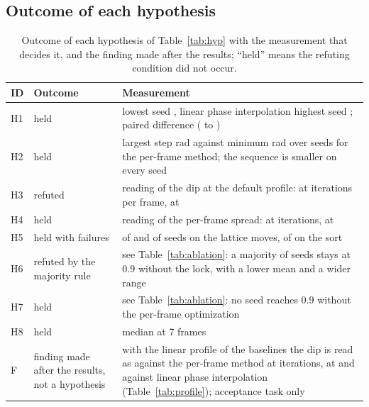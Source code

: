 \subsection{Outcome of each hypothesis}

\begin{table}[t]
\centering\small
\caption{Outcome of each hypothesis of Table~\ref{tab:hyp} with the measurement that decides it, and the finding made after the results; ``held'' means the refuting condition did not occur.}
\label{tab:outcome}
\begin{tabular}{@{}l p{3.6cm} p{8.6cm}@{}}
\toprule
ID & Outcome & Measurement\\
\midrule
H1 & held & lowest seed \bTwoMin{}, linear phase interpolation highest seed \lpiMax{}; paired difference \diffTwoMean{} (\diffTwoCiLo{} to \diffTwoCiHi{})\\
H2 & held & largest step \accBStepMax{} rad against minimum \accKimFiveStepMin{} rad over seeds for the per-frame method; the sequence is smaller on every seed\\
H3 & refuted & reading of the dip at the default profile: \readThirteenKimFiveDip{} at \parKimIters{} iterations per frame, \readThirteenKimTenDip{} at \parFrameIters{}\\
H4 & held & reading of the per-frame spread: \readThirteenKimFiveSigma{} at \parKimIters{} iterations, \readThirteenKimTenSigma{} at \parFrameIters{}\\
H5 & held with failures & \longAMet{} of \longSeeds{} and \longBMet{} of \longSeeds{} seeds on the lattice moves, \cTenMet{} of \cTenSeeds{} on the sort\\
H6 & refuted by the majority rule & see Table~\ref{tab:ablation}: a majority of seeds stays at $0.9$ without the lock, with a lower mean and a wider range\\
H7 & held & see Table~\ref{tab:ablation}: no seed reaches $0.9$ without the per-frame optimization\\
H8 & held & median \bTwoMedSeven{} at 7 frames\\
F & finding made after the results, not a hypothesis & with the linear profile of the baselines the dip is read as \readProfileLinearKimFiveDip{} against the per-frame method at \parKimIters{} iterations, \readProfileLinearKimTenDip{} at \parFrameIters{} and \readProfileLinearLpiDip{} against linear phase interpolation (Table~\ref{tab:profile}); acceptance task only\\
\bottomrule
\end{tabular}
\end{table}


